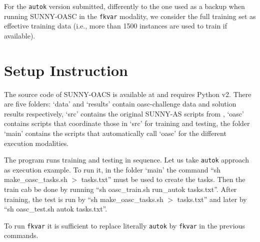 \documentclass[tablecaption=bottom,wcp]{jmlr} %
\begin{document}
For the \texttt{autok} version submitted, differently to the one used as a 
backup when running SUNNY-OASC in the \texttt{fkvar} modality, we consider the 
full training set as effective training data (i.e., more than 1500 
instances are used to train if available). 

\section{Setup Instruction}

The source code of SUNNY-OACS is available at \cite{sunnyoasc} and requires 
Python v2. There are five folders: `data' and `results' contain oasc-challenge 
data and solution results respectively, `src' contains the original SUNNY-AS 
scripts from \cite{sunnyas}, `oasc' contains scripts that coordinate those in 
`src' for training and testing, the folder `main' contains the scripts that 
automatically call `oasc' for the different execution modalities. 

The program runs training and testing in sequence. Let us take \texttt{autok} 
approach as execution example. To run it, in the folder `main' the 
command ``sh make\_oasc\_tasks.sh $>$ tasks.txt'' must be used to create 
the tasks. Then the train cab be done by running ``sh oasc\_train.sh 
run\_autok tasks.txt''. After training, the test is run by ``sh 
make\_oasc\_tasks.sh $>$ tasks.txt'' and later by ``sh oasc\_test.sh autok 
tasks.txt''.

To run \texttt{fkvar} it is sufficient to replace 
literally \texttt{autok} by \texttt{fkvar} in the previous commands. 



\end{document}
